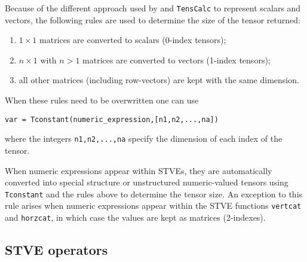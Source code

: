 \documentclass[11pt]{article}
\newcommand{\TC}{\texttt{TensCalc}}
\theoremstyle{remark}
\begin{document}
\begin{description}
  Because of the different approach used by \matlab{} and \TC{} to
  represent scalars and vectors, the following rules are used to
  determine the size of the tensor returned:
  \begin{enumerate}
  \item $1\times1$ \matlab{} matrices are converted to scalars (0-index
    tensors);
  \item $n\times1$ with $n>1$ \matlab{} matrices are converted to vectors
    (1-index tensors);
  \item all other \matlab{} matrices (including row-vectors) are kept
    with the same dimension.
  \end{enumerate}
  When these rules need to be overwritten one can use
\begin{lstlisting}
var = Tconstant(numeric_expression,[n1,n2,...,na])
\end{lstlisting}
  where the integers \lstinline{n1,n2,...,na} specify the dimension of
  each index of the tensor.

  When numeric \matlab{} expressions appear within STVEs, they are
  automatically converted into special structure or unstructured
  numeric-valued tensors using \lstinline{Tconstant} and the rules
  above to determine the tensor size. An exception to this rule arises
  when numeric \matlab{} expressions appear within the STVE
  functions \lstinline{vertcat} and \lstinline{horzcat}, in which case
  the values are kept as matrices (2-indexes).

\end{description}

\subsection{STVE operators}
\end{document}
